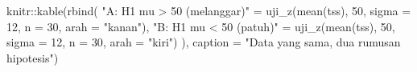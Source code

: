 \documentclass[
  indonesian,
  letterpaper,
]{book}
\newenvironment{Shaded}{\begin{snugshade}}{\end{snugshade}}
\newcommand{\AttributeTok}[1]{\textcolor[rgb]{0.40,0.45,0.13}{#1}}
\newcommand{\DecValTok}[1]{\textcolor[rgb]{0.68,0.00,0.00}{#1}}
\newcommand{\FunctionTok}[1]{\textcolor[rgb]{0.28,0.35,0.67}{#1}}
\newcommand{\NormalTok}[1]{\textcolor[rgb]{0.00,0.23,0.31}{#1}}
\newcommand{\OtherTok}[1]{\textcolor[rgb]{0.00,0.23,0.31}{#1}}
\newcommand{\SpecialCharTok}[1]{\textcolor[rgb]{0.37,0.37,0.37}{#1}}
\newcommand{\StringTok}[1]{\textcolor[rgb]{0.13,0.47,0.30}{#1}}
\begin{document}
\begin{Shaded}
\begin{Highlighting}[]
\NormalTok{knitr}\SpecialCharTok{::}\FunctionTok{kable}\NormalTok{(}\FunctionTok{rbind}\NormalTok{(}
  \StringTok{"A: H1 mu \textgreater{} 50 (melanggar)"} \OtherTok{=} \FunctionTok{uji\_z}\NormalTok{(}\FunctionTok{mean}\NormalTok{(tss), }\DecValTok{50}\NormalTok{, }\AttributeTok{sigma =} \DecValTok{12}\NormalTok{, }\AttributeTok{n =} \DecValTok{30}\NormalTok{, }\AttributeTok{arah =} \StringTok{"kanan"}\NormalTok{),}
  \StringTok{"B: H1 mu \textless{} 50 (patuh)"}     \OtherTok{=} \FunctionTok{uji\_z}\NormalTok{(}\FunctionTok{mean}\NormalTok{(tss), }\DecValTok{50}\NormalTok{, }\AttributeTok{sigma =} \DecValTok{12}\NormalTok{, }\AttributeTok{n =} \DecValTok{30}\NormalTok{, }\AttributeTok{arah =} \StringTok{"kiri"}\NormalTok{)}
\NormalTok{), }\AttributeTok{caption =} \StringTok{"Data yang sama, dua rumusan hipotesis"}\NormalTok{)}
\end{Highlighting}
\end{Shaded}
\end{document}
